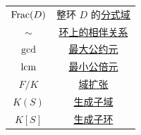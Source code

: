 \begin{center}
\begin{tabular}{c|c}
        \(\operatorname{Frac}(D)\) & 整环 \(D\) 的\hyperref[dfn:Fraction-Field]{分式域} \\
        \(\sim\) & \hyperref[dfn:Associate]{环上的相伴关系} \\
        \(\gcd\) & \hyperref[dfn:GCD]{最大公约元} \\
        \(\operatorname{lcm}\) & \hyperref[dfn:LCM]{最小公倍元} \\
        \(F/K\) & \hyperref[dfn:Field-Extension]{域扩张} \\
        \(K(S)\) & \hyperref[dfn:Generated-Subfield]{生成子域} \\
        \(K[S]\) & \hyperref[dfn:Generated-Subring]{生成子环} \\
        \bottomrule
    \end{tabular}
\end{center}